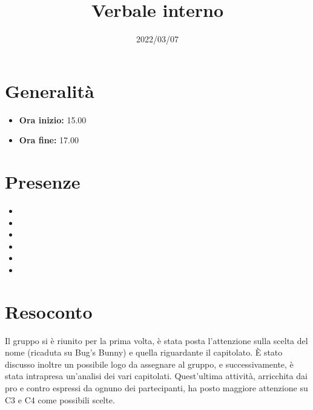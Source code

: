 \documentclass{classes/base}
\title{Verbale interno}
\date{2022/03/07}
\author{\giulio}
\renewcommand{\maketitle}{
    
}
\begin{document}
    \maketitle

    \section*{Generalità}
    \begin{itemize}
        \item \textbf{Ora inizio:} 15.00
        \item \textbf{Ora fine:} 17.00
    \end{itemize}

    \section*{Presenze}
    \begin{itemize}
        \item \marcob
        \item \angela
        \item \marcov
        \item \giulio
        \item \ruth
        \item \tommaso
    \end{itemize}

    \section*{Resoconto}
    Il gruppo si è riunito per la prima volta, è stata posta l'attenzione sulla scelta del nome (ricaduta su Bug's Bunny) e quella riguardante il capitolato.  
    È stato discusso inoltre un possibile logo da assegnare al gruppo, e successivamente, è stata intrapresa un'analisi dei vari capitolati.
    Quest'ultima attività, arricchita dai pro e contro espressi da ognuno dei partecipanti, ha posto maggiore attenzione su C3 e C4 come possibili scelte.
\end{document}
